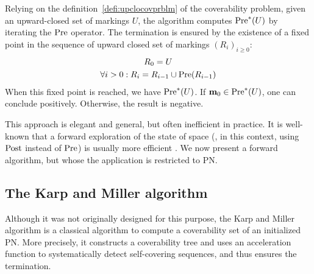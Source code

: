 Relying on the definition~\ref{defi:upclocovprblm} of the coverability problem, given an upward-closed set of markings $U$, the algorithm computes $\operatorname{Pre}^*(U)$ by iterating the $\operatorname{Pre}$ operator.
The termination is ensured by the existence of a fixed point in the sequence of upward closed set of markings $(R_i)_{i \geq 0}$:
\begin{gather*}
  R_0 = U \\
  \forall i > 0 : R_i = R_{i-1} \cup \operatorname{Pre}(R_{i-1})
\end{gather*}
When this fixed point is reached, we have $\operatorname{Pre}^*(U)$.
If $\mathbf{m}_0 \in \operatorname{Pre}^*(U)$, one can conclude positively.
Otherwise, the result is negative.

This approach is elegant and general, but often inefficient in practice.
It is well-known that a forward exploration of the state of space (, in this context, using $\operatorname{Post}$ instead of $\operatorname{Pre}$) is usually more efficient \citep{Henzinger98}.
We now present a forward algorithm, but whose the application is restricted to \ac{PN}.

\subsection{The Karp and Miller algorithm}

Although it was not originally designed for this purpose, the Karp and Miller algorithm \cite{Karp69} is a classical algorithm to compute a coverability set of an initialized \ac{PN}.
More precisely, it constructs a coverability tree and uses an acceleration function to systematically detect self-covering sequences, and thus ensures the termination.


